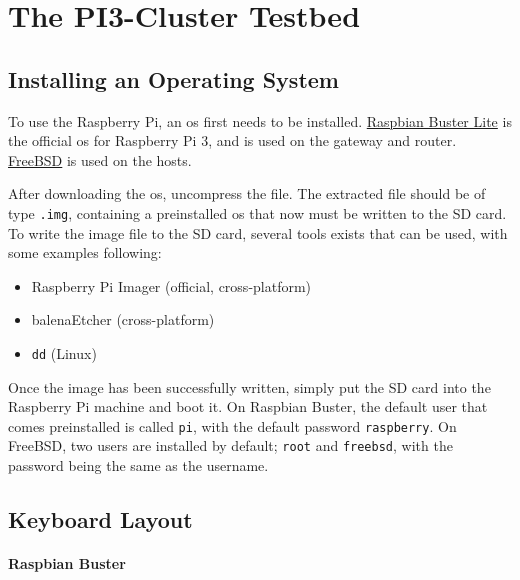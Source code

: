 \chapter{The PI3-Cluster Testbed}


\section{Installing an Operating System} \label{install_os}

To use the Raspberry Pi, an \gls{os} first needs to be installed. \href{https://www.raspberrypi.org/downloads/raspbian/}{Raspbian Buster Lite} is the official \gls{os} for Raspberry Pi 3, and is used on the gateway and router. \href{https://www.freebsd.org/}{FreeBSD} is used on the hosts.

After downloading the \gls{os}, uncompress the file. The extracted file should be of type \lstinline{.img}, containing a preinstalled \gls{os} that now must be written to the SD card. To write the image file to the SD card, several tools exists that can be used, with some examples following:

\begin{itemize}
    \item Raspberry Pi Imager (official, cross-platform)
    \item balenaEtcher (cross-platform)
    \item \lstinline{dd} (Linux)
\end{itemize}

Once the image has been successfully written, simply put the SD card into the Raspberry Pi machine and boot it. On Raspbian Buster, the default user that comes preinstalled is called \lstinline{pi}, with the default password \lstinline{raspberry}. On FreeBSD, two users are installed by default; \lstinline{root} and \lstinline{freebsd}, with the password being the same as the username.









\section{Keyboard Layout} \label{keyboard_layout}


\subsubsection{Raspbian Buster}


